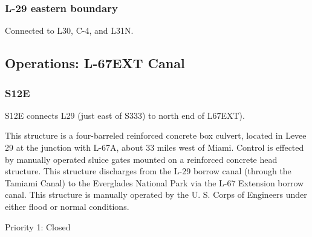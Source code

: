 \clearpage
\subsubsection{L-29 eastern boundary}
Connected to L30, C-4, and L31N.

\clearpage
\subsection{Operations: L-67EXT Canal}
\subsubsection{S12E}

S12E connects L29 (just east of S333) to north end of L67EXT).

This structure is a four-barreled reinforced concrete box culvert, located in Levee 29 at the junction with L-67A, about 33 miles west of Miami. Control is effected by manually operated sluice gates mounted on a reinforced concrete head structure. This structure discharges from the L-29 borrow canal (through the Tamiami Canal) to the Everglades National Park via the L-67 Extension borrow canal. This structure is manually operated by the U. S. Corps of Engineers under either flood or normal conditions.



\begin{packed_items}
\item Priority 1: Closed
\end{packed_items}


